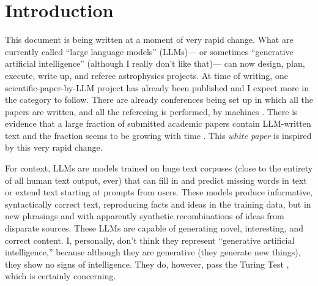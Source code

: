 \documentclass{article}
\newcommand{\documentname}{\textsl{white paper}}
\begin{document}
\section{Introduction}\label{sec:intro}
This document is being written at a moment of very rapid change.
What are currently called ``large language models'' (LLMs)---%
or sometimes ``generative artificial intelligence'' (although I really don't like that)---%
can now design, plan, execute, write up, and referee astrophysics projects.
At time of writing, one scientific-paper-by-LLM project has already been published \cite{denario} and I expect more in the category to follow.
There are already conferences being set up in which all the papers are written, and all the refereeing is performed, by machines \cite{conference}.
There is evidence that a large fraction of submitted academic papers contain LLM-written text and the fraction seems to be growing with time \cite{paperslop}.
This \documentname{} is inspired by this very rapid change.

For context, LLMs are models trained on huge text corpuses (close to the entirety of all human text output, ever) that can fill in and predict missing words in text or extend text starting at prompts from users.
These models produce informative, syntactically correct text, reproducing facts and ideas in the training data, but in new phrasings and with apparently synthetic recombinations of ideas from disparate sources.
These LLMs are capable of generating novel, interesting, and correct content.
I, personally, don't think they represent ``generative artificial intelligence,'' because although they are generative (they generate new things), they show no signs of intelligence.
They do, however, pass the Turing Test \cite{turing}, which is certainly concerning.
\end{document}
